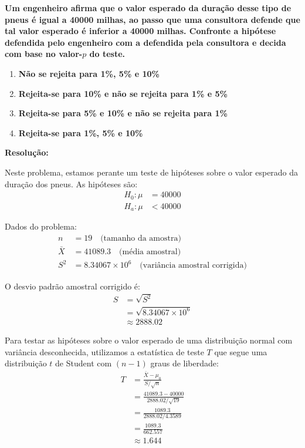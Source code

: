 \documentclass[a4paper,12pt]{article}
\begin{document}
\begin{enumerate}
    \textbf{Um engenheiro afirma que o valor esperado da duração desse tipo de pneus é igual a 40000 milhas, ao passo que uma consultora defende que tal valor esperado é inferior a 40000 milhas. Confronte a hipótese defendida pelo engenheiro com a defendida pela consultora e decida com base no valor-\(p\) do teste.}

    \vspace{0.3cm}

    \begin{enumerate}[label=\Alph*)]
        \item \textbf{Não se rejeita para 1\%, 5\% e 10\%}
        \item \textbf{Rejeita-se para 10\% e não se rejeita para 1\% e 5\%}
        \item \textbf{Rejeita-se para 5\% e 10\% e não se rejeita para 1\%}
        \item \textbf{Rejeita-se para 1\%, 5\% e 10\%}
    \end{enumerate}

    \vspace{0.3cm}

    \begin{mdframed}[backgroundcolor=gray!10, linewidth=0pt, innertopmargin=10pt, innerbottommargin=10pt]
    \textbf{Resolução:}

    Neste problema, estamos perante um teste de hipóteses sobre o valor esperado da duração dos pneus. As hipóteses são:
    \begin{align*}
    H_0: \mu &= 40000 \\
    H_a: \mu &< 40000
    \end{align*}

    Dados do problema:
    \begin{align*}
    n &= 19 \quad \text{(tamanho da amostra)} \\
    \bar{X} &= 41089.3 \quad \text{(média amostral)} \\
    S^2 &= 8.34067 \times 10^6 \quad \text{(variância amostral corrigida)}
    \end{align*}

    O desvio padrão amostral corrigido é:
    \begin{align*}
    S &= \sqrt{S^2} \\
    &= \sqrt{8.34067 \times 10^6} \\
    &\approx 2888.02
    \end{align*}

    Para testar as hipóteses sobre o valor esperado de uma distribuição normal com variância desconhecida, utilizamos a estatística de teste $T$ que segue uma distribuição $t$ de Student com $(n-1)$ graus de liberdade:
    \begin{align*}
    T &= \frac{\bar{X} - \mu_0}{S/\sqrt{n}} \\
    &= \frac{41089.3 - 40000}{2888.02/\sqrt{19}} \\
    &= \frac{1089.3}{2888.02/4.3589} \\
    &= \frac{1089.3}{662.557} \\
    &\approx 1.644
    \end{align*}


\end{mdframed}
\end{enumerate}
\end{document}
